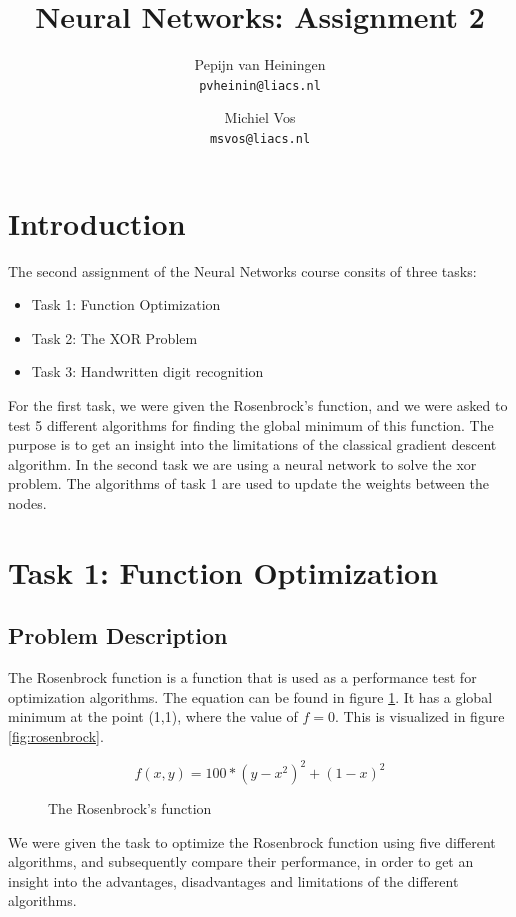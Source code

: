 \documentclass{article}
\title{Neural Networks: Assignment 2}
\author{Pepijn van Heiningen \\ \texttt{pvheinin@liacs.nl} \and Michiel Vos \\ \texttt{msvos@liacs.nl}}
\begin{document}
\maketitle

\section{Introduction}
The second assignment of the Neural Networks course consits of three tasks:\\
\begin{itemize}
\item Task 1: Function Optimization
\item Task 2: The XOR Problem
\item Task 3: Handwritten digit recognition
\end{itemize}

For the first task, we were given the Rosenbrock's function, and we were asked to test 5 different algorithms for finding the global minimum of this function. The purpose is to get an insight into the limitations of the classical gradient descent algorithm. 
In the second task we are using a neural network to solve the xor problem. The algorithms of task 1 are used to update the weights between the nodes. 



\newpage
\section{Task 1: Function Optimization}
\subsection{Problem Description}
The Rosenbrock function is a function that is used as a performance test for optimization algorithms. The equation can be found in figure \ref{eq:rosen}. It has a global minimum at the point (1,1), where the value of $f = 0$. This is visualized in figure \ref{fig:rosenbrock}. \\

\begin{figure}[H]
\[f(x,y) = 100 * (y-x^2)^2 + (1 - x)^2\]
\caption{The Rosenbrock's function}
\label{eq:rosen}
\end{figure}

We were given the task to optimize the Rosenbrock function using five different algorithms, and subsequently compare their performance, in order to get an insight into the advantages, disadvantages and limitations of the different algorithms.\\
\end{document}
